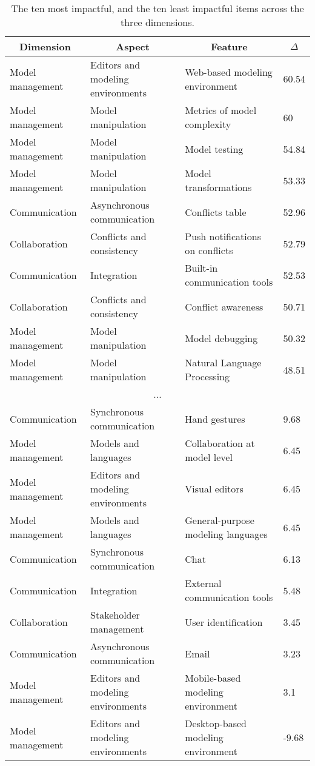 
  \begin{table*}[]
  \centering
  \notsotiny
  \caption{ The ten most impactful, and the ten least impactful items across the three dimensions.}
\label{tab:top-bottom-delta}
\begin{tabular}{@{}llll@{}}
  \toprule
\multicolumn{1}{c}{\textbf{Dimension}} & \multicolumn{1}{c}{\textbf{Aspect}} & \multicolumn{1}{c}{\textbf{Feature}} & \multicolumn{1}{c}{\textbf{$\Delta$}} \\ 

  \midrule
  Model management & Editors and modeling environments & Web-based modeling environment & 60.54 \\ 
Model management & Model manipulation & Metrics of model complexity & 60 \\ 
Model management & Model manipulation & Model testing & 54.84 \\ 
Model management & Model manipulation & Model transformations & 53.33 \\ 
Communication & Asynchronous communication & Conflicts table & 52.96 \\ 
Collaboration & Conflicts and consistency & Push notifications on conflicts & 52.79 \\ 
Communication & Integration & Built-in communication tools & 52.53 \\ 
Collaboration & Conflicts and consistency & Conflict awareness & 50.71 \\ 
Model management & Model manipulation & Model debugging & 50.32 \\ 
Model management & Model manipulation & Natural Language Processing & 48.51 \\ 
\multicolumn{4}{c}{...} \\ 
Communication & Synchronous communication & Hand gestures & 9.68 \\ 
Model management & Models and languages & Collaboration at model level & 6.45 \\ 
Model management & Editors and modeling environments & Visual editors & 6.45 \\ 
Model management & Models and languages & General-purpose modeling languages & 6.45 \\ 
Communication & Synchronous communication & Chat & 6.13 \\ 
Communication & Integration & External communication tools & 5.48 \\ 
Collaboration & Stakeholder management & User identification & 3.45 \\ 
Communication & Asynchronous communication & Email & 3.23 \\ 
Model management & Editors and modeling environments & Mobile-based modeling environment & 3.1 \\ 
Model management & Editors and modeling environments & Desktop-based modeling environment & -9.68 \\ 
\bottomrule
  \end{tabular}%
  \end{table*}